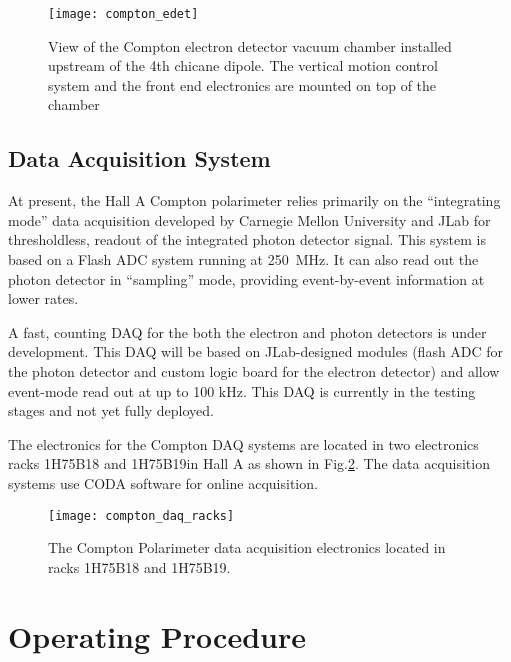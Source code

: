 { \begin{figure}[htp]
    \begin{center}
        \texttt{[image: compton\_edet]}
    \end{center}
    \caption[compton:electron detector]{
            View of the Compton electron detector vacuum chamber installed upstream of the 4th chicane dipole. 
            The vertical motion control system and the front end electronics are mounted on top of the chamber 
            }
    \label{fig:compton_edet}
 \end{figure}


\subsection{Data Acquisition System}
\label{sec:compton_daq}

At present, the Hall A Compton polarimeter relies primarily on the ``integrating mode'' data acquisition developed by
Carnegie Mellon University and JLab for thresholdless, readout of the integrated photon detector signal. This system
is based on a Flash ADC system running at 250~MHz. It can also read out the photon detector in ``sampling'' mode, providing
event-by-event information at lower rates.

A fast, counting DAQ for the both the electron and photon detectors is under development. This DAQ will be based on
JLab-designed modules (flash ADC for the photon detector and custom logic board for the electron detector) and allow
event-mode read out at up to 100 kHz. This DAQ is currently in the testing stages and not yet fully deployed.

The electronics for the Compton DAQ systems are located in two electronics racks  1H75B18 and 1H75B19in Hall A as shown in  Fig.\ref{fig:compton_daq_racks}. The data acquisition systems use CODA\cite{compton_CODA} software for online acquisition.

 \begin{figure}[htp]
    \begin{center}
        \texttt{[image: compton\_daq\_racks]}
    \end{center}
    \caption[compton:electron detector]{
            The Compton Polarimeter data acquisition electronics located in racks 1H75B18 and 1H75B19.
            }
    \label{fig:compton_daq_racks}
 \end{figure}


\section {Operating Procedure }
\label{sec:compton_oper}

}
